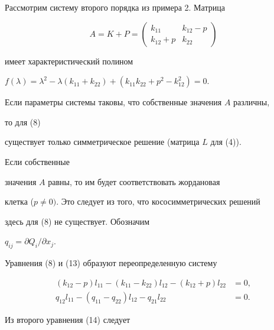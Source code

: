 \begin{exam} Рассмотрим систему второго порядка из примера 2. Матрица


$$


A=K+P=


\begin{pmatrix}


k_{11} & k_{12}-p \\


k_{12}+p & k_{22}


\end{pmatrix}


$$


имеет характеристический полином


$f(\lambda )=\lambda^{2}-\lambda (k_{11}+k_{22})+


(k_{11}k_{22}+p^{2}-k_{12}^{2})=0.$


Если параметры системы таковы, что собственные значения $A$ различны,


то для (8)


существует только симметрическое решение (матрица $L$ для (4)).


Если собственные


значения $A$ равны, то им будет соответствовать жордановая


клетка ($p\ne 0)$. Это следует из того, что кососимметрических решений


здесь для (8) не существует. Обозначим


$q_{ij}=\partial Q_{i}/\partial x_{j}$.





Уравнения (8) и (13) образуют переопределенную систему


\begin{equation}


\begin{split}


(k_{12}-p)l_{11}-(k_{11}-k_{22})l_{12}-(k_{12}+p)l_{22}&=0,\\


%


q_{12}l_{11}-(q_{11}-q_{22})l_{12}-q_{21}l_{22}&=0. 


\end{split}


\tag{14}


\end{equation}


Из второго уравнения (14) следует


$$



\end{exam}
